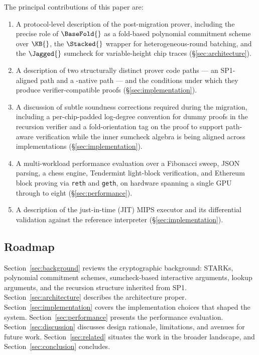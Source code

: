 The principal contributions of this paper are:
\begin{enumerate}
  \item A protocol-level description of the post-migration \Ziren{} prover, including the precise role of $\BaseFold{}$ as a fold-based polynomial commitment scheme over $\KB{}$, the $\Stacked{}$ wrapper for heterogeneous-round batching, and the $\Jagged{}$ sumcheck for variable-height chip traces (\S\ref{sec:architecture}).
  \item A description of two structurally distinct prover code paths --- an SP1-aligned path and a \Ziren{}-native path --- and the conditions under which they produce verifier-compatible proofs (\S\ref{sec:implementation}).
  \item A discussion of subtle soundness corrections required during the migration, including a per-chip-padded log-degree convention for dummy proofs in the recursion verifier and a fold-orientation tag on the proof to support path-aware verification while the inner sumcheck algebra is being aligned across implementations (\S\ref{sec:implementation}).
  \item A multi-workload performance evaluation over a Fibonacci sweep, JSON parsing, a chess engine, Tendermint light-block verification, and Ethereum block proving via \texttt{reth} and \texttt{geth}, on hardware spanning a single GPU through to eight (\S\ref{sec:performance}).
  \item A description of the just-in-time (JIT) MIPS executor and its differential validation against the reference interpreter (\S\ref{sec:implementation}).
\end{enumerate}

\subsection{Roadmap}

Section~\ref{sec:background} reviews the cryptographic background: STARKs, polynomial commitment schemes, sumcheck-based interactive arguments, lookup arguments, and the recursion structure inherited from SP1.  Section~\ref{sec:architecture} describes the \Zirenver{} architecture proper. Section~\ref{sec:implementation} covers the implementation choices that shaped the system. Section~\ref{sec:performance} presents the performance evaluation. Section~\ref{sec:discussion} discusses design rationale, limitations, and avenues for future work. Section~\ref{sec:related} situates the work in the broader \zkVM{} landscape, and Section~\ref{sec:conclusion} concludes.
